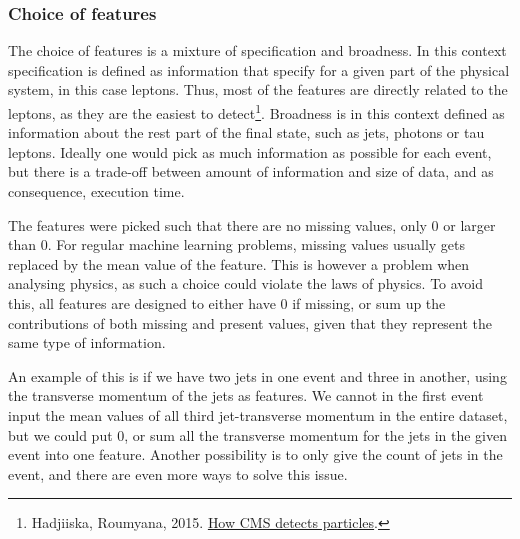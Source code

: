 \documentclass[ reprint, amsmath,amssymb, aps, nofootinbib]{revtex4-2}
\begin{document}
\subsubsection{Choice of features}
The choice of features is a mixture of specification and broadness. In this context specification is defined as information that specify for a given part of the physical system, in this case leptons. Thus, most of the features are directly related to the leptons, as they are the easiest to detect\footnote{Hadjiiska, Roumyana, 2015. \href{https://indico.cern.ch/event/464777/contributions/1971633/attachments/1197560/1742904/cmsDetector_detectParticles.pdf}{How CMS detects particles}.}. Broadness is in this context defined as information about the rest part of the final state, such as jets, photons or tau leptons. Ideally one would pick as much information as possible for each event, but there is a trade-off between amount of information and size of data, and as consequence, execution time. \par 
The features were picked such that there are no missing values, only 0 or larger than 0. For regular machine learning problems, missing values usually gets replaced by the mean value of the feature. This is however a problem when analysing physics, as such a choice could violate the laws of physics. To avoid this, all features are designed to either have 0 if missing, or sum up the contributions of both missing and present values, given that they represent the same type of information. \par 
An example of this is if we have two jets in one event and three in another, using the transverse momentum of the jets as features. We cannot in the first event input the mean values of all third jet-transverse momentum in the entire dataset, but we could put 0, or sum all the transverse momentum for the jets in the given event into one feature. Another possibility is to only give the count of jets in the event, and there are even more ways to solve this issue. 



 
\end{document}
